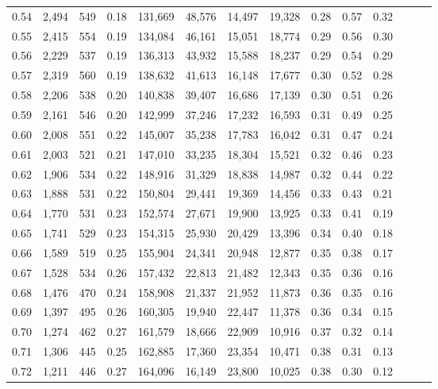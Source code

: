 \begin{tabular}{rrrrrrrrrrrrrr}
0.54 &  2,494 &  549 &  0.18 &  131,669 &   48,576 &  14,497 &  19,328 &  0.28 &  0.57 &      0.32 \\
0.55 &  2,415 &  554 &  0.19 &  134,084 &   46,161 &  15,051 &  18,774 &  0.29 &  0.56 &      0.30 \\
0.56 &  2,229 &  537 &  0.19 &  136,313 &   43,932 &  15,588 &  18,237 &  0.29 &  0.54 &      0.29 \\
0.57 &  2,319 &  560 &  0.19 &  138,632 &   41,613 &  16,148 &  17,677 &  0.30 &  0.52 &      0.28 \\
0.58 &  2,206 &  538 &  0.20 &  140,838 &   39,407 &  16,686 &  17,139 &  0.30 &  0.51 &      0.26 \\
0.59 &  2,161 &  546 &  0.20 &  142,999 &   37,246 &  17,232 &  16,593 &  0.31 &  0.49 &      0.25 \\
0.60 &  2,008 &  551 &  0.22 &  145,007 &   35,238 &  17,783 &  16,042 &  0.31 &  0.47 &      0.24 \\
0.61 &  2,003 &  521 &  0.21 &  147,010 &   33,235 &  18,304 &  15,521 &  0.32 &  0.46 &      0.23 \\
0.62 &  1,906 &  534 &  0.22 &  148,916 &   31,329 &  18,838 &  14,987 &  0.32 &  0.44 &      0.22 \\
0.63 &  1,888 &  531 &  0.22 &  150,804 &   29,441 &  19,369 &  14,456 &  0.33 &  0.43 &      0.21 \\
0.64 &  1,770 &  531 &  0.23 &  152,574 &   27,671 &  19,900 &  13,925 &  0.33 &  0.41 &      0.19 \\
0.65 &  1,741 &  529 &  0.23 &  154,315 &   25,930 &  20,429 &  13,396 &  0.34 &  0.40 &      0.18 \\
0.66 &  1,589 &  519 &  0.25 &  155,904 &   24,341 &  20,948 &  12,877 &  0.35 &  0.38 &      0.17 \\
0.67 &  1,528 &  534 &  0.26 &  157,432 &   22,813 &  21,482 &  12,343 &  0.35 &  0.36 &      0.16 \\
0.68 &  1,476 &  470 &  0.24 &  158,908 &   21,337 &  21,952 &  11,873 &  0.36 &  0.35 &      0.16 \\
0.69 &  1,397 &  495 &  0.26 &  160,305 &   19,940 &  22,447 &  11,378 &  0.36 &  0.34 &      0.15 \\
0.70 &  1,274 &  462 &  0.27 &  161,579 &   18,666 &  22,909 &  10,916 &  0.37 &  0.32 &      0.14 \\
0.71 &  1,306 &  445 &  0.25 &  162,885 &   17,360 &  23,354 &  10,471 &  0.38 &  0.31 &      0.13 \\
0.72 &  1,211 &  446 &  0.27 &  164,096 &   16,149 &  23,800 &  10,025 &  0.38 &  0.30 &      0.12 \\

\end{tabular}
